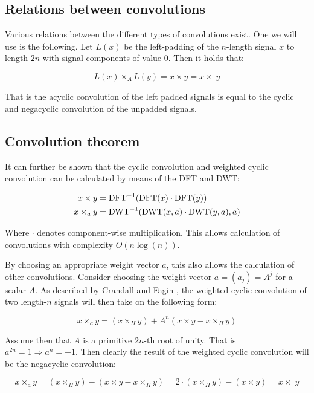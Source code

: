 \subsection{Relations between convolutions}
\label{sec:relations_between_convolutions}

Various relations between the different types of convolutions exist. One we
will use is the following. Let $L(x)$ be the left-padding of the $n$-length
signal $x$ to length $2n$ with signal components of value $0$. Then it holds
that: \autocite{crandallPrimeNumbersComputational2005}

\[
		L(x) \times_A L(y) = x \times y = x \times_\_ y
\]

That is the acyclic convolution of the left padded signals is equal to the
cyclic and negacyclic convolution of the unpadded signals.

\subsection{Convolution theorem}
\label{sec:convolution_theorem}

It can further be shown that the cyclic convolution and weighted cyclic
convolution can be calculated by means of the DFT and DWT:
\autocite{crandallPrimeNumbersComputational2005}

\begin{align*}
		x \times y & = \operatorname{DFT}^{-1}(\operatorname{DFT}(x) \cdot \operatorname{DFT}(y)) \\
		x \times_a y & = \operatorname{DWT}^{-1}(\operatorname{DWT}(x, a) \cdot \operatorname{DWT}(y, a), a)
\end{align*}

Where $\cdot$ denotes component-wise multiplication. This allows calculation of
convolutions with complexity $O(n \log(n))$.

By choosing an appropriate weight vector $a$, this also allows the calculation
of other convolutions. Consider choosing the weight vector $a = (a_j) = A^j$
for a scalar $A$. As described by Crandall and Fagin
\autocite{crandallDiscreteWeightedTransforms1994}, the weighted cyclic
convolution of two length-$n$ signals will then take on the following form:

\[
		x \times_a y = (x \times_H y)  + A^n (x \times y - x \times_H y)
\]

Assume then that $A$ is a primitive $2n$-th root of unity. That is $a^{2n} = 1
\Rightarrow a^n = -1$. Then clearly the result of the weighted cyclic
convolution will be the negacyclic convolution:

\[
		x \times_a y = (x \times_H y) - (x \times y - x \times_H y) = 2 \cdot (x \times_H y) - (x \times y) = x \times_\_ y
\]
